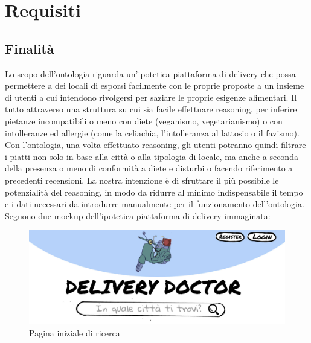 \documentclass[12pt]{article}
\begin{document}
\section{Requisiti}

\subsection{Finalità}
Lo scopo dell'ontologia riguarda un'ipotetica piattaforma di delivery che possa permettere a dei locali di esporsi facilmente con le proprie proposte a un insieme di utenti a cui intendono rivolgersi per saziare le proprie esigenze alimentari. 
Il tutto attraverso una struttura su cui sia facile effettuare reasoning, per  inferire pietanze incompatibili o meno con diete (veganismo, vegetarianismo) o con intolleranze ed allergie (come la celiachia, l'intolleranza al lattosio o il favismo).\newline 
Con l'ontologia, una volta effettuato reasoning, gli utenti potranno quindi filtrare i piatti non solo in base alla città o alla tipologia di locale, ma anche a seconda della presenza o meno di conformità a diete e disturbi o facendo riferimento a precedenti recensioni.\newline
La nostra intenzione è di sfruttare il più possibile le potenzialità del reasoning, in modo da ridurre al minimo indispensabile il tempo e i dati necessari da introdurre manualmente per il funzionamento dell'ontologia.\newline
Seguono due mockup dell'ipotetica piattaforma di delivery immaginata:
\label{sec:mockupFinali}
\begin{figure}[H]
    \centering
         \includegraphics[width=12cm]{files/mockup1.jpg}
    \caption{Pagina iniziale di ricerca}
\end{figure}
\end{document}
